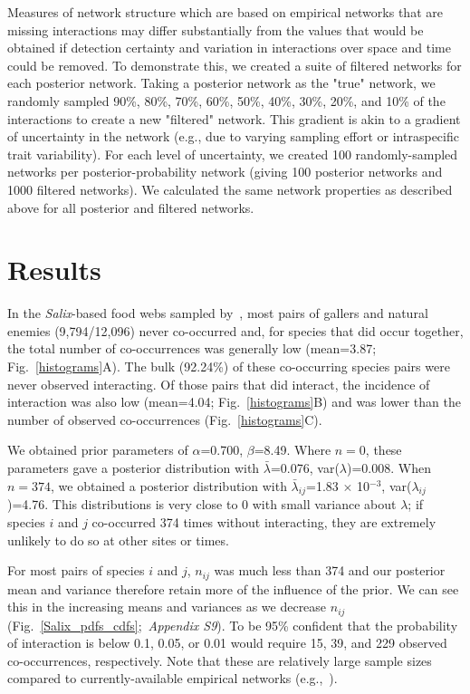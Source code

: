 \documentclass[12pt]{article}
\begin{document}
\begin{spacing}{2.0}
      Measures of network structure which are based on empirical networks that are missing interactions may differ substantially from the values that would be obtained if detection certainty and variation in interactions over space and time could be removed. To demonstrate this, we created a suite of filtered networks for each posterior network. Taking a posterior network as the "true" network, we randomly sampled 90\%, 80\%, 70\%, 60\%, 50\%, 40\%, 30\%, 20\%, and 10\% of the interactions to create a new "filtered" network. This gradient is akin to a gradient of uncertainty in the network (e.g., due to varying sampling effort or intraspecific trait variability). For each level of uncertainty, we created 100 randomly-sampled networks per posterior-probability network (giving 100 posterior networks and 1000 filtered networks). We calculated the same network properties as described above for all posterior and filtered networks.


\section*{Results}

  In the \emph{Salix}-based food webs sampled by~\citet{Kopelke2017}, most pairs of gallers and natural enemies (9,794/12,096) never co-occurred and, for species that did occur together, the total number of co-occurrences was generally low (mean=3.87; Fig.~\ref{histograms}A). The bulk (92.24\%) of these co-occurring species pairs were never observed interacting. Of those pairs that did interact, the incidence of interaction was also low (mean=4.04; Fig.~\ref{histograms}B) and was lower than the number of observed co-occurrences (Fig.~\ref{histograms}C).


  We obtained prior parameters of $\alpha$=0.700, $\beta$=8.49. Where $n = 0$, these parameters gave a posterior distribution with $\bar\lambda$=0.076, var($\lambda$)=0.008. When $n = 374$, we obtained a posterior distribution with $\bar\lambda_{ij}$=1.83 $\times$ 10$^{-3}$, var($\lambda_{ij}$)=4.76. This distributions is very close to 0 with small variance about $\lambda$; if species $i$ and $j$ co-occurred 374 times without interacting, they   are extremely unlikely to do so at other sites or times. 


  For most pairs of species $i$ and $j$, $n_{ij}$ was much less than 374 and our posterior mean and variance therefore retain more of the influence of the prior. We can see this in the increasing means and variances as we decrease $n_{ij}$ (Fig.~\ref{Salix_pdfs_cdfs};~\emph{Appendix S9}). To be 95\% confident that the probability of interaction is below 0.1, 0.05, or 0.01 would require 15, 39, and 229 observed co-occurrences, respectively. Note that these are relatively large sample sizes compared to currently-available empirical networks (e.g.,~\citealp{Morris2014}).



\end{spacing}
\end{document}
